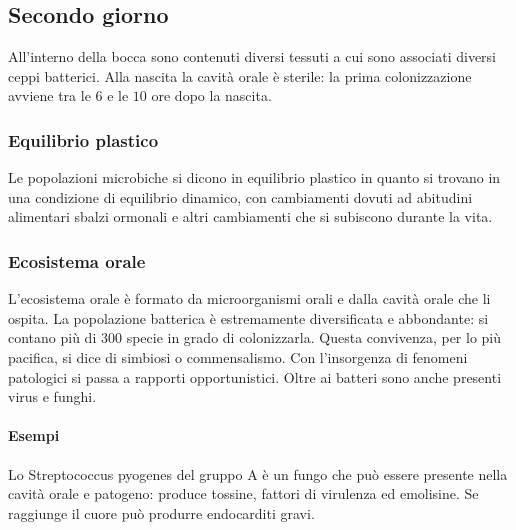 	\subsection{Secondo giorno}
	All'interno della bocca sono contenuti diversi tessuti a cui sono associati diversi ceppi batterici.
	Alla nascita la cavit\`a orale \`e sterile: la prima colonizzazione avviene tra le $6$ e le $10$ ore dopo la nascita.
	
		\subsubsection{Equilibrio plastico}
		Le popolazioni microbiche si dicono in equilibrio plastico in quanto si trovano in una condizione di equilibrio dinamico, con cambiamenti dovuti ad abitudini alimentari sbalzi ormonali e altri cambiamenti che si subiscono durante la vita.

		\subsubsection{Ecosistema orale}
		L'ecosistema orale \`e formato da microorganismi orali e dalla cavit\`a orale che li ospita.
		La popolazione batterica \`e estremamente diversificata e abbondante: si contano pi\`u di $300$ specie in grado di colonizzarla.
		Questa convivenza, per lo pi\`u pacifica, si dice di simbiosi o commensalismo.
		Con l'insorgenza di fenomeni patologici si passa a rapporti opportunistici.
		Oltre ai batteri sono anche presenti virus e funghi.
		
			\paragraph{Esempi}
			Lo Streptococcus pyogenes del gruppo A \`e un fungo che pu\`o essere presente nella cavit\`a orale e patogeno: produce tossine, fattori di virulenza ed emolisine.
			Se raggiunge il cuore pu\`o produrre endocarditi gravi.

